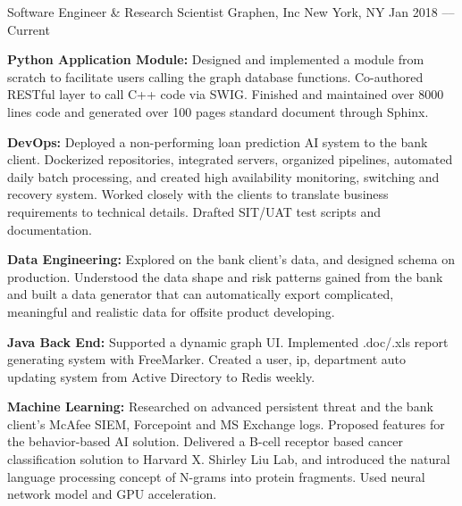 

\begin{cventries}
	
	\cventry
	{Software Engineer \& Research Scientist} %
	{Graphen, Inc} %
	{New York, NY} %
	{Jan 2018 –– Current} %
	{
		\begin{cvitems} %
			\item {\textbf{Python Application Module:} Designed and implemented a module from scratch to facilitate users calling the graph database functions. Co-authored RESTful layer to call C++ code via SWIG. Finished and maintained over 8000 lines code and generated over 100 pages standard document through Sphinx.}
			\item {\textbf{DevOps:} Deployed a non-performing loan prediction AI system to the bank client. Dockerized repositories, integrated servers, organized pipelines, automated daily batch processing, and created high availability monitoring, switching and recovery system. Worked closely with the clients to translate business requirements to technical details. Drafted SIT/UAT test scripts and documentation.}
			\item {\textbf{Data Engineering:} Explored on the bank client's data, and designed schema on production. Understood the data shape and risk patterns gained from the bank and built a data generator that can automatically export complicated, meaningful and realistic data for offsite product developing.}
			\item {\textbf{Java Back End:} Supported a dynamic graph UI. Implemented .doc/.xls report generating system with FreeMarker. Created a user, ip, department auto updating system from Active Directory to Redis weekly.}
			\item {\textbf{Machine Learning:} Researched on advanced persistent threat and the bank client's McAfee SIEM, Forcepoint and MS Exchange logs. Proposed features for the behavior-based AI solution. Delivered a B-cell receptor based cancer classification solution to Harvard X. Shirley Liu Lab, and introduced the natural language processing concept of N-grams into protein fragments. Used neural network model and GPU acceleration.}
		\end{cvitems}
	}


\end{cventries}
